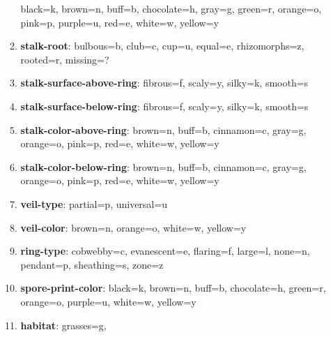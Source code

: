 \documentclass[fleqn]{article}
\begin{document}
\begin{enumerate}
\begin{enumerate}[label=\roman*.]
                black=k,
                brown=n,
                buff=b,
                chocolate=h,
                gray=g,
                green=r,
                orange=o,
                pink=p,
                purple=u,
                red=e,
                white=w,
                yellow=y
            \item \textbf{stalk-root}:
                bulbous=b,
                club=c,
                cup=u,
                equal=e,
                rhizomorphs=z,
                rooted=r,
                missing=?
            \item \textbf{stalk-surface-above-ring}:
                fibrous=f,
                scaly=y,
                silky=k,
                smooth=s
            \item \textbf{stalk-surface-below-ring}:
                fibrous=f,
                scaly=y,
                silky=k,
                smooth=s
            \item \textbf{stalk-color-above-ring}:
                brown=n,
                buff=b,
                cinnamon=c,
                gray=g,
                orange=o,
                pink=p,
                red=e,
                white=w,
                yellow=y
            \item \textbf{stalk-color-below-ring}:
                brown=n,
                buff=b,
                cinnamon=c,
                gray=g,
                orange=o,
                pink=p,
                red=e,
                white=w,
                yellow=y
            \item \textbf{veil-type}:
                partial=p,
                universal=u
            \item \textbf{veil-color}:
                brown=n,
                orange=o,
                white=w,
                yellow=y
            \item \textbf{ring-type}:
                cobwebby=c,
                evanescent=e,
                flaring=f,
                large=l,
                none=n,
                pendant=p,
                sheathing=s,
                zone=z
            \item \textbf{spore-print-color}:
                black=k,
                brown=n,
                buff=b,
                chocolate=h,
                green=r,
                orange=o,
                purple=u,
                white=w,
                yellow=y
            \item \textbf{habitat}:
                grasses=g,

\end{enumerate}
\end{enumerate}
\end{document}
